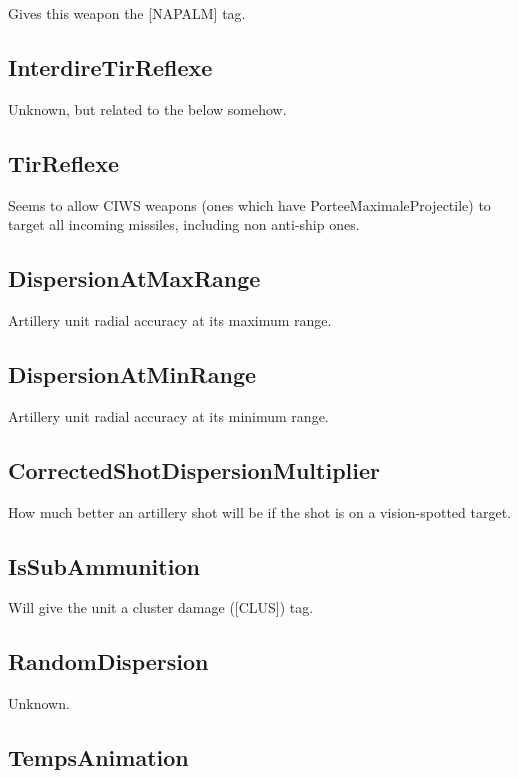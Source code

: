 \documentclass{article}
\begin{document}
Gives this weapon the [NAPALM] tag.

\subsection{InterdireTirReflexe}

Unknown, but related to the below somehow.

\subsection{TirReflexe}

Seems to allow CIWS weapons (ones which have PorteeMaximaleProjectile) to target all incoming missiles, including non anti-ship ones.

\subsection{DispersionAtMaxRange}

Artillery unit radial accuracy at its maximum range.

\subsection{DispersionAtMinRange}

Artillery unit radial accuracy at its minimum range.

\subsection{CorrectedShotDispersionMultiplier}

How much better an artillery shot will be if the shot is on a vision-spotted target.

\subsection{IsSubAmmunition}

Will give the unit a cluster damage ([CLUS]) tag.

\subsection{RandomDispersion}

Unknown.

\subsection{TempsAnimation}
\end{document}
